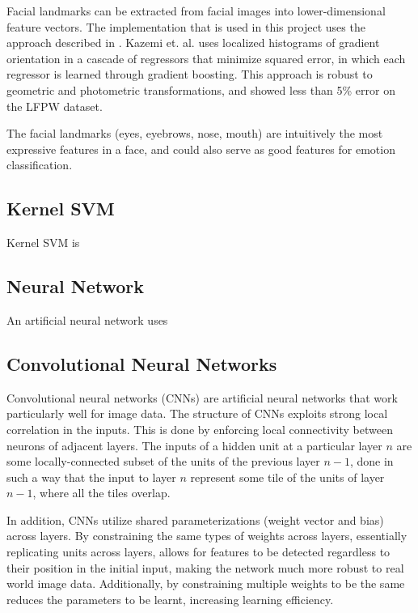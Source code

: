 \documentclass[11pt, twocolumn, twoside]{article}
\begin{document}
Facial landmarks can be extracted from facial images into lower-dimensional feature
vectors. The implementation that is used in this project uses the approach described
in \cite{Kazemi}. Kazemi et. al. uses localized histograms of gradient orientation in
a cascade of regressors that minimize squared error, in which each regressor is learned
through gradient boosting. This approach is robust to geometric and photometric
transformations, and showed less than 5\% error on the LFPW dataset.

The facial landmarks (eyes, eyebrows, nose, mouth) are intuitively the most expressive 
features in a face, and could also serve as good features for emotion classification.

\subsection{Kernel SVM}

Kernel SVM is 

\subsection{Neural Network}

An artificial neural network uses

\subsection{Convolutional Neural Networks}

Convolutional neural networks (CNNs) are artificial neural networks that work particularly well for image data. The structure of CNNs exploits strong local correlation in the inputs. This is done by enforcing local connectivity between neurons of adjacent layers. The inputs of a hidden unit at a particular layer $n$ are some locally-connected subset of the units of the previous layer $n-1$, done in such a way that the input to layer $n$ represent some tile of the units of layer $n-1$, where all the tiles overlap.

In addition, CNNs utilize shared parameterizations (weight vector and bias) across layers. By constraining the same types of weights across layers, essentially replicating units across layers, allows for features to be detected regardless to their position in the initial input, making the network much more robust to real world image data. Additionally, by constraining multiple weights to be the same reduces the parameters to be learnt, increasing learning efficiency.
\end{document}
